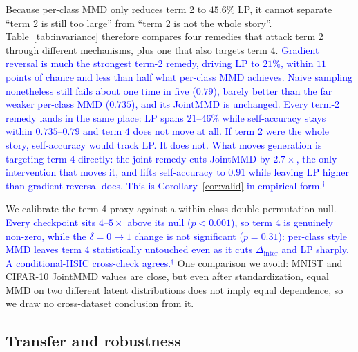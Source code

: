 \documentclass[letterpaper]{article} %
\newcommand{\pj}[1]{\textcolor{blue}{#1$^{\dagger}$}}
\newcommand{\Dinter}{\Delta_{\mathrm{inter}}}
\begin{document}
Because per-class MMD only reduces term 2 to $45.6\%$ LP, it cannot separate
``term 2 is still too large'' from ``term 2 is not the whole story''.
Table~\ref{tab:invariance} therefore compares four remedies that attack term
2 through different mechanisms, plus one that also targets term 4.
\pj{Gradient reversal is much the strongest term-2 remedy, driving LP to
$21\%$, within $11$ points of chance and less than half what per-class MMD
achieves. Naive sampling nonetheless still fails about one time in five
($0.79$), barely better than the far weaker per-class MMD ($0.735$), and its
JointMMD is unchanged. Every term-2 remedy lands in the same place: LP spans
$21$--$46\%$ while self-accuracy stays within $0.735$--$0.79$ and term 4 does
not move at all. If term 2 were the whole story, self-accuracy would track
LP. It does not. What moves generation is targeting term 4 directly: the
joint remedy cuts JointMMD by $2.7\times$, the only intervention that moves
it, and lifts self-accuracy to $0.91$ while leaving LP higher than gradient
reversal does. This is Corollary~\ref{cor:valid} in empirical form.}

We calibrate the term-4 proxy against a within-class double-permutation null.
\pj{Every checkpoint sits $4$--$5\times$ above its null ($p<0.001$), so term
4 is genuinely non-zero, while the $\delta{=}0\to1$ change is not significant
($p{=}0.31$): per-class style MMD leaves term 4 statistically untouched even
as it cuts $\Dinter$ and LP sharply. A conditional-HSIC cross-check agrees.}
One comparison we avoid: MNIST and CIFAR-10 JointMMD values are close, but
even after standardization, equal MMD on two different latent distributions
does not imply equal dependence, so we draw no cross-dataset conclusion from
it.

\subsection{Transfer and robustness}
\label{sec:exp-robust}
\end{document}
